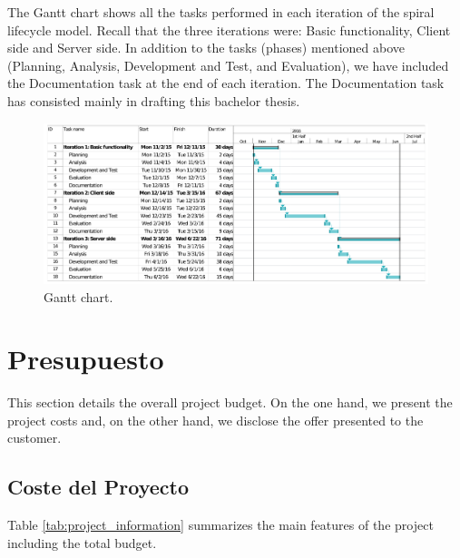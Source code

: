The Gantt chart shows all the tasks performed in each iteration of the spiral lifecycle model. Recall that the three iterations were: Basic functionality, Client side and Server side. In addition to the tasks (phases) mentioned above (Planning, Analysis, Development and Test, and Evaluation), we have included the Documentation task at the end of each iteration. The Documentation task has consisted mainly in drafting this bachelor thesis.


\begin{figure}[htbp]
 	\centering
 	\includegraphics[width=16.5cm]{figures/gantt}
 	\caption{Gantt chart.}
	\label{fig:gantt}
\end{figure}

\section{Presupuesto}
\label{sec:budget}

This section details the overall project budget. On the one hand, we present the project costs and, on the other hand, we disclose the offer presented to the customer.

\subsection{Coste del Proyecto}

Table \ref{tab:project_information} summarizes the main features of the project including the total budget. 

